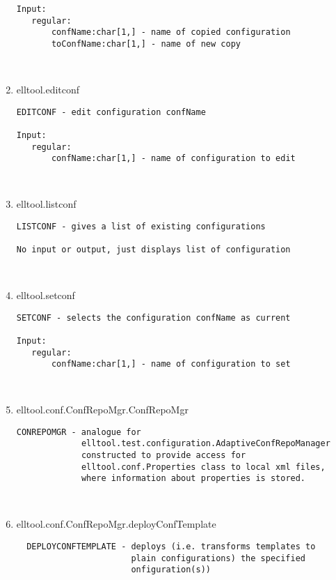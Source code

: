 \begin{enumerate}
\begin{lstlisting}
Input:
   regular:
       confName:char[1,] - name of copied configuration
       toConfName:char[1,] - name of new copy



\end{lstlisting}
\fontfamily{\familydefault}
\selectfont
\item {elltool.editconf}
\selectfont
\begin{lstlisting}
EDITCONF - edit configuration confName

Input:
   regular:
       confName:char[1,] - name of configuration to edit



\end{lstlisting}
\fontfamily{\familydefault}
\selectfont
\item {elltool.listconf}
\selectfont
\begin{lstlisting}
LISTCONF - gives a list of existing configurations

No input or output, just displays list of configuration



\end{lstlisting}
\fontfamily{\familydefault}
\selectfont
\item {elltool.setconf}
\selectfont
\begin{lstlisting}
SETCONF - selects the configuration confName as current

Input:
   regular:
       confName:char[1,] - name of configuration to set



\end{lstlisting}
\fontfamily{\familydefault}
\selectfont
\item {elltool.conf.ConfRepoMgr.ConfRepoMgr}
\selectfont
\begin{lstlisting}
CONREPOMGR - analogue for
             elltool.test.configuration.AdaptiveConfRepoManager
             constructed to provide access for
             elltool.conf.Properties class to local xml files,
             where information about properties is stored.



\end{lstlisting}
\fontfamily{\familydefault}
\selectfont
\item {elltool.conf.ConfRepoMgr.deployConfTemplate}
\selectfont
\begin{lstlisting}
  DEPLOYCONFTEMPLATE - deploys (i.e. transforms templates to
                       plain configurations) the specified
                       onfiguration(s))


\end{lstlisting}
\end{enumerate}
